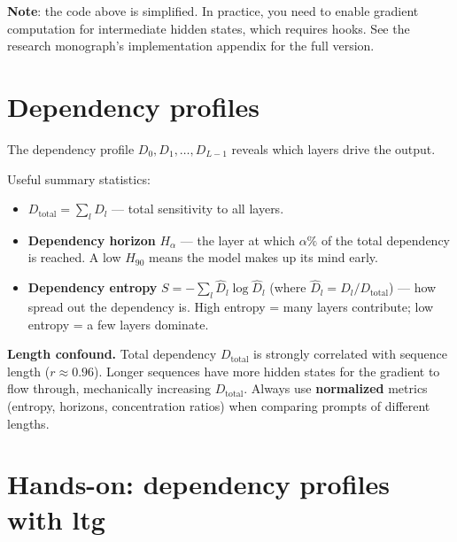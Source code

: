 \documentclass[11pt, twoside, openright]{memoir}
\begin{document}
\textbf{Note}: the code above is simplified. In practice, you need to enable
gradient computation for intermediate hidden states, which requires hooks.
See the research monograph's implementation appendix for the full version.

\section{Dependency profiles}

The dependency profile $D_0, D_1, \ldots, D_{L-1}$ reveals which layers
drive the output.

Useful summary statistics:
\begin{itemize}[nosep]
\item $D_{\text{total}} = \sum_l D_l$ --- total sensitivity to all layers.
\item \textbf{Dependency horizon} $H_\alpha$ --- the layer at which
  $\alpha\%$ of the total dependency is reached. A low $H_{90}$ means
  the model makes up its mind early.
\item \textbf{Dependency entropy} $S = -\sum_l \hat{D}_l \log \hat{D}_l$
  (where $\hat{D}_l = D_l / D_{\text{total}}$) --- how spread out the
  dependency is. High entropy = many layers contribute; low entropy = a
  few layers dominate.
\end{itemize}

\begin{pitfall}
\textbf{Length confound.} Total dependency $D_{\text{total}}$ is strongly
correlated with sequence length ($r \approx 0.96$). Longer sequences have
more hidden states for the gradient to flow through, mechanically increasing
$D_{\text{total}}$. Always use \textbf{normalized} metrics (entropy,
horizons, concentration ratios) when comparing prompts of different lengths.
\end{pitfall}

\section{Hands-on: dependency profiles with ltg}
\end{document}

